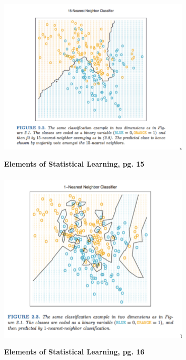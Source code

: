\documentclass[xetex,mathserif,serif,aspectratio=169]{beamer}
\begin{document}
\begin{frame}[fragile] \frametitle{} \oldB \small

\begin{center}
\includegraphics[width=0.7\textwidth]{img/pg15.pdf}
\end{center}

{\small \textbf{Elements of Statistical Learning, pg. 15}}

\end{frame}

\begin{frame}[fragile] \frametitle{} \oldB \small

\begin{center}
\includegraphics[width=0.7\textwidth]{img/pg16.pdf}
\end{center}

{\small \textbf{Elements of Statistical Learning, pg. 16}}

\end{frame}
\end{document}
